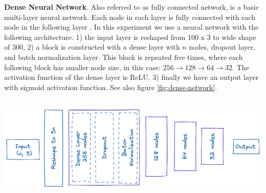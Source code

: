 \begin{minipage}{\textwidth}
\textbf{Dense Neural Network}. Also referred to as fully connected network, is a basic multi-layer neural network. Each node in each layer is fully connected with each node in the following layer \cite{Goodfellow2016}. In this experiment we use a neural network with the following architecture. 1) the input layer is reshaped from 100 x 3 to wide shape of 300, 2) a block is constructed with a dense layer with $n$ nodes, dropout layer, and batch normalization layer. This block is repeated five times, where each following block has smaller node size, in this case: $256 \rightarrow 128 \rightarrow 64 \rightarrow 32$. The activation function of the dense layer is ReLU. 3) finally we have an output layer with sigmoid activation function. See also figure \ref{fig:dense-network}.
\baselineskip

\begin{center}
\includegraphics[height=5cm]{images/5_multimodal_fusion/dense-network-3.png}
\captionsetup{width=0.90\textwidth}
\label{fig:dense-network}
\end{center}
\end{minipage}

\baselineskip

